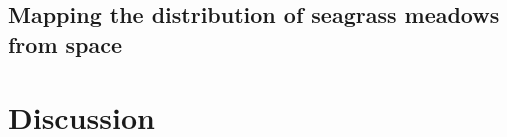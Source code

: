 \documentclass[
	10pt, %
	a4paper, %
]{LegrandOrangeBook}
\begin{document}
\chapter{Mapping the distribution of seagrass meadows from space}

 {
  \hypersetup{hidelinks}
  \part{Discussion}
 }

\stopcontents[part] %


\chapterimage{} %
\chapterspaceabove{2.5cm} %
\chapterspacebelow{2cm} %


\printbibliography




\end{document}
